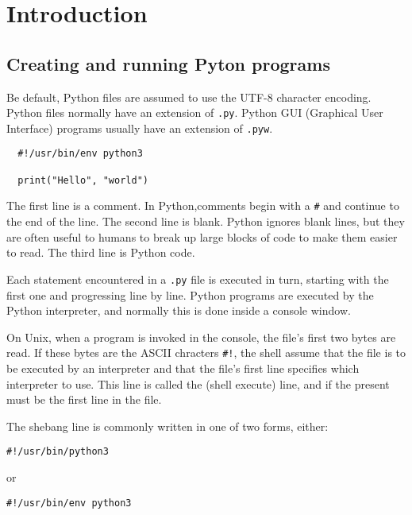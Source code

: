 
\chapter{Introduction}

\section{Creating and running Pyton programs}

Be default, Python files are assumed to use the UTF-8 character encoding.
Python files normally have an extension of \verb|.py|.
Python GUI (Graphical User Interface) programs usually have an extension of \verb|.pyw|.



\begin{lstlisting}
  #!/usr/bin/env python3

  print("Hello", "world")
\end{lstlisting}



The first line is a comment.
In Python,comments begin with a \verb|#| and continue to the end of the line.
The second line is blank.
Python ignores blank lines, but they are often useful to humans to break up large blocks of code to make them easier to read.
The third line is Python code.


Each statement encountered in a \verb|.py| file is executed in turn, starting with the first one and progressing line by line.
Python programs are executed by the Python interpreter, and normally this is done inside a console window.



On Unix, when a program is invoked in the console, the file's first two bytes are read.
If these bytes are the ASCII chracters \verb|#!|, the shell assume that the file is to be executed by an interpreter and that the file's first line specifies which interpreter to use.
This line is called the  (shell execute) line, and if the present must be the first line in the file.



The shebang line is commonly written in one of two forms, either:
\begin{lstlisting}
#!/usr/bin/python3
\end{lstlisting}

or

\begin{lstlisting}
#!/usr/bin/env python3
\end{lstlisting}


